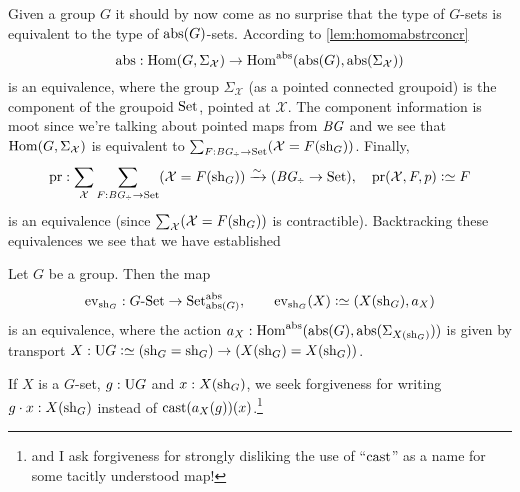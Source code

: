 Given a group $G$ it should by now come as no surprise that the type of $G$-sets is equivalent to the type of $\mathrm{abs}(G)$-sets.
According to \cref{lem:homomabstrconcr}
$$\abstr:\Hom(G,\Sigma_{\mathcal X})\to\Hom^\abstr(\abstr(G),\abstr(\Sigma_{\mathcal X}))$$
is an equivalence, where the group $\Sigma_{\mathcal X}$ (as a pointed connected groupoid) is the component of the groupoid $\mathrm{Set}$, pointed at $\mathcal X$.  The component information is moot since we're talking about pointed maps from $\mathit{B}\mathit{G}$ and we see that $\Hom(G,\Sigma_{\mathcal X})$ is equivalent to $\sum_{F:\BG_\div\to\Set}(\mathcal X=F(\shape_G))$.  Finally,
$$\mathrm{pr}:\sum_{\mathcal X}\sum_{F:\BG_\div\to\Set}(\mathcal X=F(\shape_G))\we
(\BG_\div\to\Set),\quad \mathrm{pr}(\mathcal X,F,p)\defequi F
$$
is an equivalence (since $\sum_{\mathcal X}(\mathcal X=F(\mathrm{sh}_G))$ is contractible).
Backtracking these equivalences we see that we have established
\begin{lemma}
  \label{lem:actionsconcreteandabstract}
  Let $G$ be a group.  Then the map
  $$\ev_{\shape_G}:\GSet\to\Set^\abstr_{\abstr(G)},\qquad \ev_{\shape_G}(X)\defequi(X(\shape_G),a_X)
$$
is an equivalence, where the action $a_X:\Hom^\abstr(\abstr(G), \abstr(\Sigma_{X(\shape_G)}))$ is given by transport $X:\USym G\defequi(\shape_G=\shape_G)\to (X(\shape_G)=X(\shape_G))$.
\end{lemma}
If $X$ is a $G$-set, $g:\mathrm{U} G$ and $x:X(\mathrm{sh}_G)$, we seek forgiveness for writing $g\cdot x:X(\mathrm{sh}_G)$ instead of $\cast(a_X(g))(x)$.\footnote{and I ask forgiveness for strongly disliking the use of ``$\cast$'' as a name for some tacitly understood map!}

